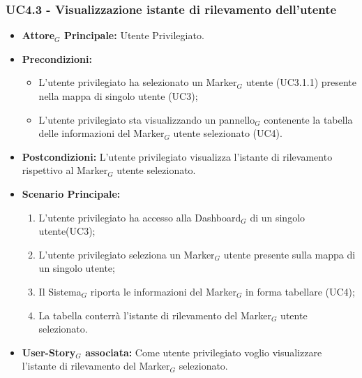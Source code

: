 \documentclass[10pt]{article}
\begin{document}
\begin{justify}
\subsubsection{\textbf{UC4.3 - Visualizzazione istante di rilevamento dell'utente}}
\label{UC4.3}
\begin{itemize}
     \item \textbf{Attore$_G$ Principale:} Utente Privilegiato.
     \item \textbf{Precondizioni:}
        \begin{itemize}
          \item L'utente privilegiato ha selezionato un Marker$_G$ utente (UC3.1.1) presente nella mappa di singolo utente (UC3);
          \item L'utente privilegiato sta visualizzando un pannello$_G$ contenente la tabella delle informazioni del Marker$_G$ utente selezionato (UC4).
        \end{itemize}
      \item \textbf{Postcondizioni:} L'utente privilegiato visualizza l'istante di rilevamento rispettivo al Marker$_G$ utente selezionato. 
      \item \textbf{Scenario Principale:}
        \begin{enumerate}
            \item L'utente privilegiato ha accesso alla Dashboard$_G$ di un singolo utente(UC3);
            \item L'utente privilegiato seleziona un Marker$_G$ utente presente sulla mappa di un singolo utente;
            \item Il Sistema$_G$ riporta le informazioni del Marker$_G$ in forma tabellare (UC4);
            \item La tabella conterrà l'istante di rilevamento del Marker$_G$ utente selezionato.
        \end{enumerate}
     \item \textbf{User-Story$_G$ associata:}
       Come utente privilegiato voglio visualizzare l'istante di rilevamento del Marker$_G$ selezionato.
\end{itemize}

\end{justify}
\end{document}
